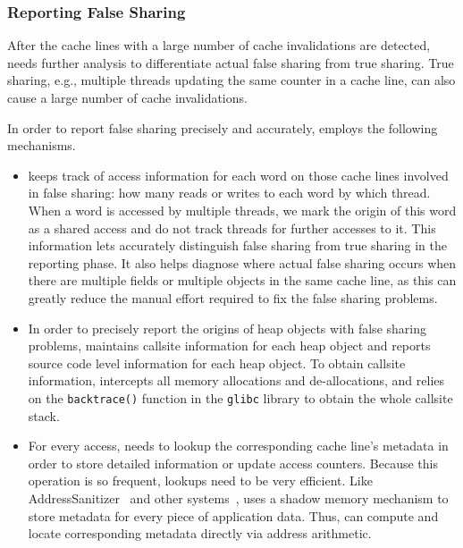 \subsubsection{Reporting False Sharing}

After the cache lines with a large number of cache invalidations are detected,
\Predator{} needs further analysis to differentiate actual false sharing from true sharing. 
True sharing, e.g., multiple threads updating the same counter in a
cache line, can also cause a large number of cache invalidations.

In order to report false sharing precisely and accurately,  
\Predator{} employs the following mechanisms. 

\begin{itemize}
\item

\Predator{} keeps track of access information for each word on those
cache lines involved in false sharing: how many reads or writes to
each word by which thread.  When a word is accessed by multiple
threads, we mark the origin of this word as a shared access and do not
track threads for further accesses to it. This information
lets \Predator{} accurately distinguish false sharing from true
sharing in the reporting phase.  It also helps diagnose where
actual false sharing occurs when there are multiple fields or multiple
objects in the same cache line, as this can greatly reduce the manual
effort required to fix the false sharing problems.

\item
In order to precisely report the origins of heap objects with false
sharing problems, \Predator{} maintains callsite information for each heap
object and reports source code level information for each heap
object. To obtain callsite information, \Predator{} intercepts all
memory allocations and de-allocations, and relies
on the \texttt{backtrace()} function in the \texttt{glibc} library to obtain
the whole callsite stack.

\item
For every access, \Predator{} needs to lookup the corresponding cache line's metadata 
in order to store detailed information or update access counters. Because this operation is so frequent,
 lookups need to be very efficient.
Like 
AddressSanitizer~\cite{Addresssanitizer} and other systems~\cite{qinzhaodetection,Valgrind},
\Predator{} uses a shadow memory mechanism to store metadata for every piece of application data. 
Thus, \Predator{} can compute and locate corresponding metadata directly via address arithmetic.


\end{itemize}
